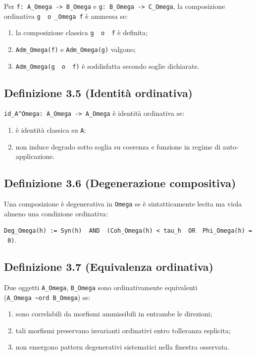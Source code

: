Per \texttt{f:\ A\_Omega\ -\textgreater{}\ B\_Omega} e \texttt{g:\ B\_Omega\ -\textgreater{}\ C\_Omega}, la composizione ordinativa \texttt{g\ \ o\ \_Omega\ f} è ammessa se:

\begin{enumerate}
\def\labelenumi{\arabic{enumi}.}
\tightlist
\item
  la composizione classica \texttt{g\ \ o\ \ f} è definita;
\item
  \texttt{Adm\_Omega(f)} e \texttt{Adm\_Omega(g)} valgono;
\item
  \texttt{Adm\_Omega(g\ \ o\ \ f)} è soddisfatta secondo soglie dichiarate.
\end{enumerate}

\subsection{Definizione 3.5 (Identità ordinativa)}

\texttt{id\_A\^{}Omega:\ A\_Omega\ -\textgreater{}\ A\_Omega} è identità ordinativa se:

\begin{enumerate}
\def\labelenumi{\arabic{enumi}.}
\tightlist
\item
  è identità classica su \texttt{A};
\item
  non induce degrado sotto soglia su coerenza e funzione in regime di auto-applicazione.
\end{enumerate}

\subsection{Definizione 3.6 (Degenerazione compositiva)}

Una composizione è degenerativa in \texttt{Omega} se è sintatticamente lecita ma viola almeno una condizione ordinativa:

\texttt{Deg\_Omega(h)\ :=\ Syn(h)\ \ AND\ \ (Coh\_Omega(h)\ \textless{}\ tau\_h\ \ OR\ \ Phi\_Omega(h)\ =\ 0)}.

\subsection{Definizione 3.7 (Equivalenza ordinativa)}

Due oggetti \texttt{A\_Omega}, \texttt{B\_Omega} sono ordinativamente equivalenti (\texttt{A\_Omega\ \textasciitilde{}ord\ B\_Omega}) se:

\begin{enumerate}
\def\labelenumi{\arabic{enumi}.}
\tightlist
\item
  sono correlabili da morfismi ammissibili in entrambe le direzioni;
\item
  tali morfismi preservano invarianti ordinativi entro tolleranza esplicita;
\item
  non emergono pattern degenerativi sistematici nella finestra osservata.
\end{enumerate}

